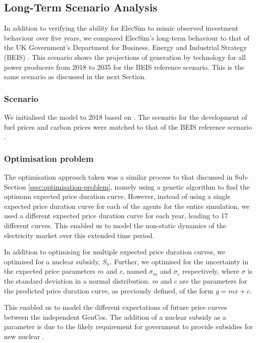 \subsection{Long-Term Scenario Analysis}
\label{sssec:scen-analysis}

In addition to verifying the ability for ElecSim to mimic observed investment behaviour over five years, we compared ElecSim's long-term behaviour to that of the UK Government's Department for Business, Energy and Industrial Strategy (BEIS) \cite{DBEIS2019}. This scenario shows the projections of generation by technology for all power producers from 2018 to 2035 for the BEIS reference scenario. This is the same scenario as discussed in the next Section.

\subsubsection{Scenario}
\label{sssec:scenario-details}

We initialised the model to 2018 based on \cite{Kell}. The scenario for the development of fuel prices and carbon prices were matched to that of the BEIS reference scenario \cite{DBEIS2019}.


\subsubsection{Optimisation problem} The optimisation approach taken was a similar process to that discussed in Sub-Section \ref{ssec:optimisation-problem}, namely using a genetic algorithm to find the optimum expected price duration curve. However, instead of using a single expected price duration curve for each of the agents for the entire simulation, we used a different expected price duration curve for each year, leading to 17 different curves. This enabled us to model the non-static dynamics of the electricity market over this extended time period. 

In addition to optimising for multiple expected price duration curves, we optimised for a nuclear subsidy, $S_n$. Further, we optimised for the uncertainty in the expected price parameters $m$ and $c$, named $\sigma_m$ and $\sigma_c$ respectively, where $\sigma$ is the standard deviation in a normal distribution. $m$ and $c$ are the parameters for the predicted price duration curve, as previously defined, of the form $y=mx+c$.  

This enabled us to model the different expectations of future price curves between the independent GenCos. The addition of a nuclear subsidy as a parameter is due to the likely requirement for government to provide subsidies for new nuclear \cite{Suna2016}.

